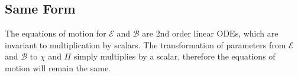 \subsection{Same Form}
The equations of motion for $\mathcal E$ and $\mathcal B$ are 2nd order linear ODEs, which are invariant to multiplication by scalars. The transformation of parameters from $\mathcal E$ and $\mathcal B$ to $\chi$ and $\Pi$ simply multiplies by a scalar, therefore the equations of motion will remain the same.